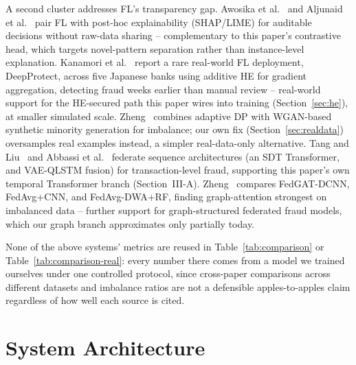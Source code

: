 \documentclass[12pt]{svproc}
\begin{document}
A second cluster addresses FL's transparency gap. Awosika et
al.~\cite{awosika2024xaifl} and Aljunaid et al.~\cite{aljunaid2025xfl}
pair FL with post-hoc explainability (SHAP/LIME) for auditable
decisions without raw-data sharing -- complementary to this paper's
contrastive head, which targets novel-pattern separation rather than
instance-level explanation. Kanamori et
al.~\cite{kanamori2022deepprotect} report a rare real-world FL
deployment, DeepProtect, across five Japanese banks using additive HE
for gradient aggregation, detecting fraud weeks earlier than manual
review -- real-world support for the HE-secured path this paper wires
into training (Section~\ref{sec:he}), at smaller simulated scale.
Zheng~\cite{zheng2025wgandp} combines adaptive DP with WGAN-based
synthetic minority generation for imbalance; our own fix
(Section~\ref{sec:realdata}) oversamples real examples instead, a
simpler real-data-only alternative. Tang and Liu~\cite{tang2024sdt} and
Abbassi et al.~\cite{abbassi2025vaeqlstm} federate sequence
architectures (an SDT Transformer, and VAE-QLSTM fusion) for
transaction-level fraud, supporting this paper's own temporal
Transformer branch (Section~III-A). Zheng~\cite{hzheng2025fedgat}
compares FedGAT-DCNN, FedAvg+CNN, and FedAvg-DWA+RF, finding
graph-attention strongest on imbalanced data -- further support for
graph-structured federated fraud models, which our graph branch
approximates only partially today.

None of the above systems' metrics are reused in
Table~\ref{tab:comparison} or Table~\ref{tab:comparison-real}: every
number there comes from a model we trained ourselves under one
controlled protocol, since cross-paper comparisons across different
datasets and imbalance ratios are not a defensible apples-to-apples
claim regardless of how well each source is cited.

\section{System Architecture}
\end{document}
